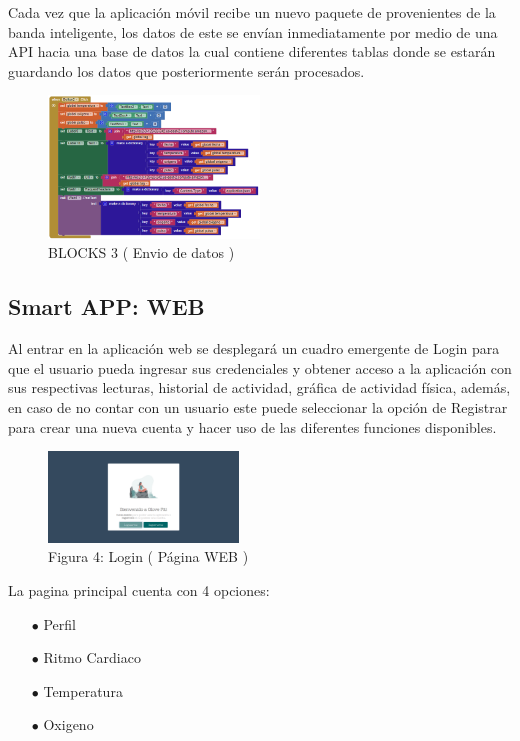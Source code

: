 \documentclass[osajnl,twocolumn,showpacs,superscriptaddress,10pt]{revtex4-1}
\begin{document}
    Cada vez que la aplicación móvil recibe un nuevo paquete de provenientes de la banda inteligente, los datos de este se envían inmediatamente por medio de una API hacia una base de datos la cual contiene diferentes tablas donde se estarán guardando los datos que posteriormente serán procesados.
    
\begin{figure} [H] \centering 
\caption{BLOCKS 3 ( Envio de datos )}
\includegraphics[width=0.5\textwidth]{EviarDatos.PNG} 
\end{figure}
\subsection{Smart APP: WEB}

    Al entrar en la aplicación web se desplegará un cuadro emergente de Login para que el usuario pueda ingresar sus credenciales y obtener acceso a la aplicación con sus respectivas lecturas, historial de actividad, gráfica de actividad física, además, en caso de no contar con un usuario este puede seleccionar la opción de Registrar para crear una nueva cuenta y hacer uso de las diferentes funciones disponibles.
    
\begin{figure} [H] \centering 
\caption{Figura 4: Login ( Página WEB )}
\includegraphics[width=0.45\textwidth]{Login.PNG}
\end{figure}

La pagina principal cuenta con 4 opciones:
\begin{itemize}
    \item[$\bullet$]Perfil 
    \item[$\bullet$]Ritmo Cardiaco
    \item[$\bullet$]Temperatura
    \item[$\bullet$]Oxigeno
\end{itemize}
\end{document}
